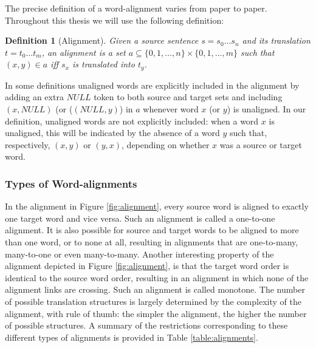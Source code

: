 \documentclass{report}
\theoremstyle{definition}
\theoremstyle{plain}
\newtheorem{definition}{Definition}
\begin{document}
The precise definition of a word-alignment varies from paper to paper. Throughout this thesis we will use the following definition:

\begin{definition}[Alignment]
Given a source sentence $s = s_0 \ldots s_n$ and its translation $t = t_0 \ldots t_m$, an alignment is a set $a \subseteq \{0,1,\ldots,n\} \times \{0,1,\ldots,m\}$ such that $(x,y)\in a$ iff $s_x$ is translated into $t_y$.
\end{definition}

In some definitions unaligned words are explicitly included in the alignment by adding an extra $NULL$ token to both source and target sets and including $(x,NULL)$ (or ($(NULL,y)$) in $a$ whenever word $x$ (or $y$) is unaligned. In our definition, unaligned words are not explicitly included: when a word $x$ is unaligned, this will be indicated by the absence of a word $y$ such that, respectively, $(x,y)$ or $(y,x)$, depending on whether $x$ was a source or target word. 


\subsubsection{Types of Word-alignments}

In the alignment in Figure \ref{fig:alignment}, every source word is aligned to exactly one target word and vice versa. Such an alignment is called a one-to-one alignment. It is also possible for source and target words to be aligned to more than one word, or to none at all, resulting in alignments that are one-to-many, many-to-one or even many-to-many. Another interesting property of the alignment depicted in Figure \ref{fig:alignment}, is that the target word order is identical to the source word order, resulting in an alignment in which none of the alignment links are crossing. Such an alignment is called monotone. The number of possible translation structures is largely determined by the complexity of the alignment, with rule of thumb: the simpler the alignment, the higher the number of possible structures. A summary of the restrictions corresponding to these different types of alignments is provided in Table \ref{table:alignments}.
\end{document}
